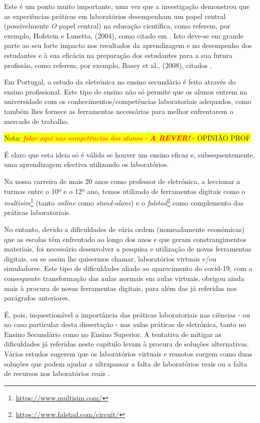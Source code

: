 Este é um ponto muito importante, uma vez que a investigação demonstrou que as experiências práticas em laboratórios desempenham um papel central (possivelmente \textit{O} papel central) na educação científica, como referem, por exemplo, Hofstein e Lunetta, (2004), como citado em \cite{BRINSON2015218}. Isto deve-se em grande parte ao seu forte impacto nos resultados da aprendizagem e no desempenho dos estudantes e à sua eficácia na preparação dos estudantes para a sua futura profissão, como referem, por exemplo, Basey et al., (2008), citados \cite{BRINSON2015218}.

Em Portugal, o estudo da eletrónica no ensino secundário é feito através do ensino profissional. Este tipo de ensino não só permite que os alunos entrem na universidade com os conhecimentos/competências laboratoriais adequados, como também lhes fornece as ferramentas necessárias para melhor enfrentarem o mercado de trabalho\cite{anqep}.

\colorbox{yellow}{Nota: \textit{\textcolor{red}{falar aqui nas competências dos alunos - \textbf{ A REVER!}}} - OPINIÃO PROF}

É claro que esta ideia só é válida se houver um ensino eficaz e, subsequentemente, uma aprendizagem efectiva utilizando os laboratórios.

Na nossa carreira de mais 20 anos como professor de eletrónica, a leccionar a turmas entre o 10º e o 12º ano, temos utilizado de ferramentas digitais como o \textit{multisim}\footnote{\url{https://www.multisim.com/}} (tanto \textit{online} como \textit{stand-alone}) e o \textit{falstad}\footnote{\url{https://www.falstad.com/circuit/}} como complemento das práticas laboratoriais.

No entanto, devido a dificuldades de vária ordem (nomeadamente económicas) que as escolas têm enfrentado ao longo dos anos e que geram constrangimentos materiais, foi necessário desenvolver a pesquisa e utilização de novas ferramentas digitais, ou se assim lhe quisermos chamar, laboratórios virtuais e/ou simuladores.
Este tipo de dificuldades aliado ao aparecimento do \acrshort{covid-19}, com a consequente transformação das aulas normais em aulas virtuais, obrigou ainda mais à procura de novas ferramentas digitais, para além das já referidas nos parágrafos anteriores.

É, pois, inquestionável a importância das práticas laboratoriais nas ciências - ou no caso particular desta dissertação - nas aulas práticas de eletrónica, tanto no Ensino Secundário como no Ensino Superior. A tentativa de mitigar as dificuldades já referidas neste capítulo levam à procura de soluções alternativas. Vários estudos sugerem que os laboratórios virtuais e remotos surgem como duas soluções que podem ajudar a ultrapassar a falta de laboratórios reais ou a falta de recursos nos laboratórios reais \cite{ImpactRemoteLabTeachingPractices} \cite{developremotelabs} \cite{HERADIO20161} \cite{POTKONJAK2016309}.

